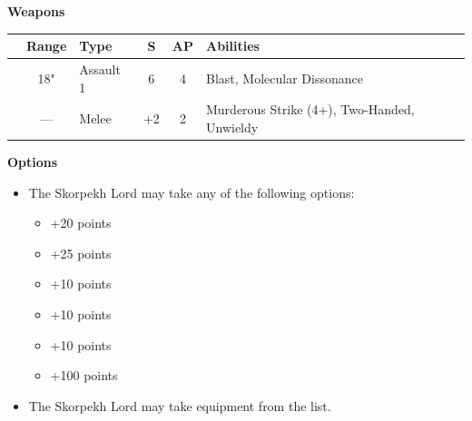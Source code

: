 \begin{minipage}[t]{0.72\textwidth}
	\vspace*{2em}
	\textbf{Weapons}
	
	\begin{tabular}{L{90 pt} c C{40pt} *{2}{c} >{\raggedright\arraybackslash}p{130pt}}
		& Range & Type & S & AP & Abilities \\
		\hline
		 & 18" & Assault 1 & 6 & 4 & Blast, Molecular Dissonance \\
		 & — & Melee & +2 & 2 & Murderous Strike (4+), Two-Handed, Unwieldy \\
	\end{tabular}
	
	\vspace*{2em}
	\textbf{Options}
	\begin{itemize}
		\item The Skorpekh Lord may take any of the following options:
		\begin{itemize}
			\item {} \dotfill +20 points
			\item {} \dotfill +25 points
			\item {} \dotfill +10 points
			\item {} \dotfill +10 points
			\item {} \dotfill +10 points
			\item {} \dotfill +100 points
		\end{itemize}
		\item The Skorpekh Lord may take equipment from the  list.
	\end{itemize}
\end{minipage}
\hspace{0.5em}

\newpage
